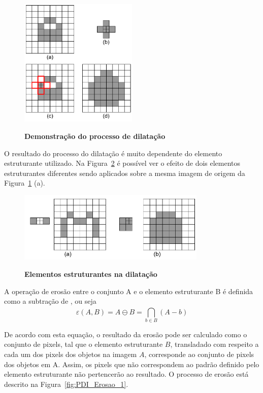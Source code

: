 \documentclass[12pt,oneside,a4paper,english,french,spanish,brazil,]{abntex2}
\begin{document}
\begin{figure}[ht]
\centering
\caption{\textbf{Demonstração do processo de dilatação}}
\includegraphics[width=0.5\textwidth]{imagens/PDI_Dilatacao_1.pdf}
\sourceAuthor
\label{fig:PDI_Dilatacao_1}
\end{figure}

O resultado do processo do dilatação é muito dependente do elemento estruturante utilizado. Na Figura~\ref{fig:PDI_Dilatacao_2} é possível ver o efeito de dois elementos estruturantes diferentes sendo aplicados sobre a mesma imagem de origem da Figura~\ref{fig:PDI_Dilatacao_1} (a).

\begin{figure}[ht]
\centering
\caption{\textbf{Elementos estruturantes na dilatação}}
\includegraphics[width=0.8\textwidth]{imagens/PDI_Dilatacao_2.pdf}
\sourceAuthor
\label{fig:PDI_Dilatacao_2}
\end{figure}

A operação de erosão entre o conjunto A e o elemento estruturante B é definida como a subtração de \citet{minkowski:1911}, ou seja \[\varepsilon(A,B)=A\ominus B=\bigcap_{b\in B}^{ } (A-b)\]

De acordo com esta equação, o resultado da erosão pode ser calculado como o conjunto de pixels, tal que o elemento estruturante \(B\), transladado com respeito a cada um dos pixels dos objetos na imagem \(A\), corresponde ao conjunto de pixels dos objetos em A. Assim, os pixels que não correspondem ao padrão definido pelo elemento estruturante não pertencerão ao resultado. O processo de erosão está descrito na Figura~\ref{fig:PDI_Erosao_1}.
\end{document}
